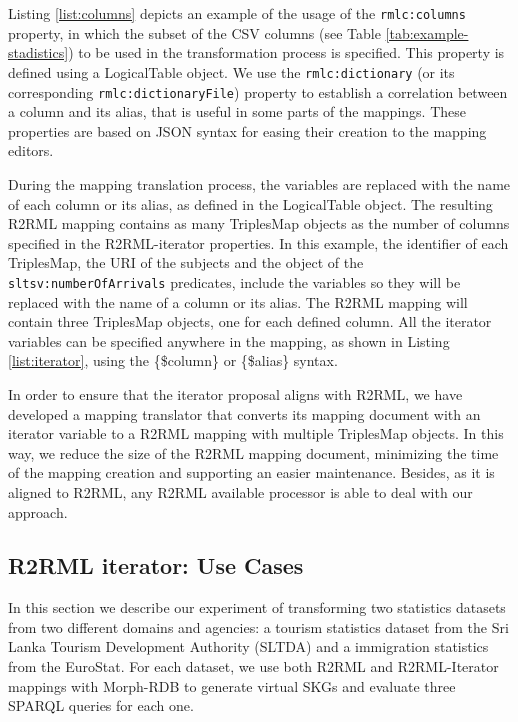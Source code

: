 Listing \ref{list:columns} depicts an example of the usage of the \texttt{rmlc:columns} property, in which the subset of the CSV columns (see Table \ref{tab:example-stadistics}) to be used in the transformation process is specified. This property is defined using a LogicalTable object. We use the \texttt{rmlc:dictionary} (or its corresponding \texttt{rmlc:dictionaryFile}) property to establish a correlation between a column and its alias, that is useful in some parts of the mappings. These properties are based on JSON syntax for easing their creation to the mapping editors.

During the mapping translation process, the variables are replaced with the name of each column or its alias, as defined in the LogicalTable object. The resulting R2RML mapping contains as many TriplesMap objects as the number of columns specified in the R2RML-iterator properties. In this example, the identifier of each TriplesMap, the URI of the subjects and the object of the \texttt{sltsv:numberOfArrivals} predicates, include the variables so they will be replaced with the name of a column or its alias. The R2RML mapping will contain three TriplesMap objects, one for each defined column. All the iterator variables can be specified anywhere in the mapping, as shown in Listing \ref{list:iterator}, using the \{\$column\} or \{\$alias\} syntax.

In order to ensure that the iterator proposal aligns with R2RML, we have developed a mapping translator that converts its mapping document with an iterator variable to a R2RML mapping with multiple TriplesMap objects. In this way, we reduce the size of the R2RML mapping document, minimizing the time of the mapping creation and supporting an easier maintenance. Besides, as it is aligned to R2RML, any R2RML available processor is able to deal with our approach. 

\subsection{R2RML iterator: Use Cases}
In this section we describe our experiment of transforming two statistics datasets from two different domains and agencies: a tourism statistics dataset from the Sri Lanka Tourism Development Authority (SLTDA) and a immigration statistics from the EuroStat. For each dataset, we use both R2RML and R2RML-Iterator mappings with Morph-RDB to generate virtual SKGs and evaluate three SPARQL queries for each one.

